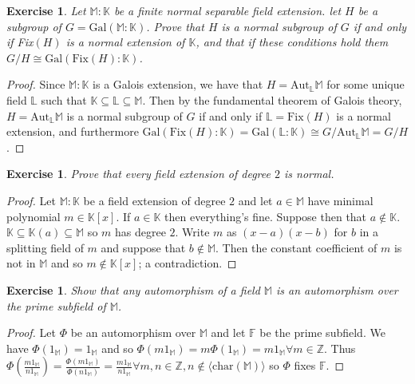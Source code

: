 \documentclass{article}
\newtheorem{exercise}[theorem]{Exercise}
\begin{document}
\begin{exercise}
Let $\mathbb{M}:\mathbb{K}$ be a finite normal separable field extension. let $H$ be a subgroup of $G=\text{Gal}(\mathbb{M}:\mathbb{K})$. Prove that $H$ is a normal subgroup of $G$ if and only if Fix$(H)$ is a normal extension of $\mathbb{K}$, and that if these conditions hold them $G/H\cong\text{Gal}(\text{Fix}(H):\mathbb{K})$.
\end{exercise}
\begin{proof}
Since $\mathbb{M}:\mathbb{K}$ is a Galois extension, we have that $H=\text{Aut}_\mathbb{L}\mathbb{M}$ for some unique field $\mathbb{L}$ such that $\mathbb{K}\subseteq\mathbb{L}\subseteq\mathbb{M}$. Then by the fundamental theorem of Galois theory, $H=\text{Aut}_\mathbb{L}\mathbb{M}$ is a normal subgroup of $G$ if and only if $\mathbb{L}=\text{Fix}(H)$ is a normal extension, and furthermore $\text{Gal}(\text{Fix}(H):\mathbb{K})=\text{Gal}(\mathbb{L}:\mathbb{K})\cong G/\text{Aut}_\mathbb{L}\mathbb{M}=G/H$.
\end{proof}

\begin{exercise}
Prove that every field extension of degree $2$ is normal.
\end{exercise}
\begin{proof}
Let $\mathbb{M}:\mathbb{K}$ be a field extension of degree $2$ and let $a\in\mathbb{M}$ have minimal polynomial $m\in\mathbb{K}[x]$. If $a\in\mathbb{K}$ then everything's fine. Suppose then that $a\not\in\mathbb{K}$. $\mathbb{K}\subseteq\mathbb{K}(a)\subseteq\mathbb{M}$ so $m$ has degree $2$. Write $m$ as $(x-a)(x-b)$ for $b$ in a splitting field of $m$ and suppose that $b\not\in\mathbb{M}$. Then the constant coefficient of $m$ is not in $\mathbb{M}$ and so $m\not\in\mathbb{K}[x]$; a contradiction.
\end{proof}

\begin{exercise}
Show that any automorphism of a field $\mathbb{M}$ is an automorphism  over the prime subfield of $\mathbb{M}$.
\end{exercise}
\begin{proof}
Let $\Phi$ be an automorphism over $\mathbb{M}$ and let $\mathbb{F}$ be the prime subfield. We have $\Phi(1_\mathbb{M})=1_\mathbb{M}$ and so $\Phi(m1_\mathbb{M})=m\Phi(1_\mathbb{M})=m1_\mathbb{M}\forall m\in\mathbb{Z}$. Thus $\Phi(\frac{m1_\mathbb{M}}{n1_\mathbb{M}})=\frac{\Phi(m1_\mathbb{M})}{\Phi(n1_\mathbb{M})}=\frac{m1_\mathbb{M}}{n1_\mathbb{M}}\forall m,n\in\mathbb{Z},n\not\in\langle\text{char}(\mathbb{M}) \rangle$ so $\Phi$ fixes $\mathbb{F}$.
\end{proof}
\end{document}
